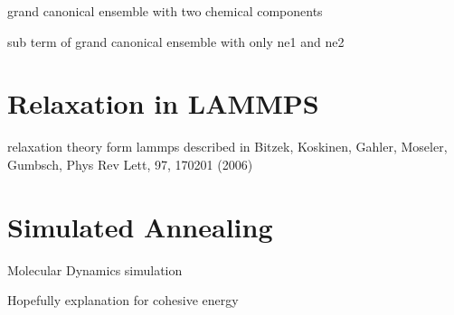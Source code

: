 grand canonical ensemble with two chemical components

sub term of grand canonical ensemble with only ne1 and ne2
\section{Relaxation in LAMMPS}
relaxation theory form lammps 
described in Bitzek, Koskinen, Gahler, Moseler, Gumbsch, Phys Rev Lett, 97, 170201 (2006)
 
\section{Simulated Annealing}
Molecular Dynamics simulation

Hopefully explanation for cohesive energy


%
